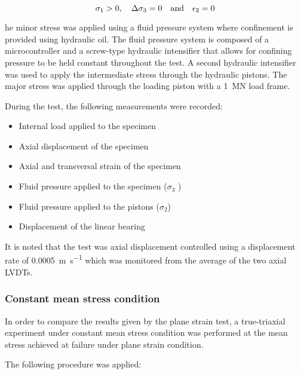 \begin{equation}
    \sigma_1 > 0 ,\quad \Delta\sigma_3 = 0 \quad \textmd{and} \quad \epsilon_2= 0
\end{equation}

he minor stress was applied using a fluid pressure system where confinement is provided using hydraulic oil. The fluid pressure system is composed of a microcontroller and a screw-type hydraulic intensifier that allows for confining pressure to be held constant throughout the test. A second hydraulic intensifier was used to apply the intermediate stress through the hydraulic pistons. The major stress was applied through the loading piston with a \SI{1}{\mega\newton} load frame. 

During the test, the following measurements were recorded: 

\begin{itemize}
    \item Internal load applied to the specimen 
    \item Axial displacement of the specimen 
    \item Axial and transversal strain of the specimen
    \item Fluid pressure applied to the specimen ($\sigma_3$ ) 
    \item Fluid pressure applied to the pistons ($\sigma_2$) 
    \item Displacement of the linear bearing
\end{itemize}

It is noted that the test was axial displacement controlled using a displacement rate of \SI{0.0005}{\meter\per\second} which was monitored from the average of the two axial LVDTs.

\subsubsection{Constant mean stress condition}


In order to compare the results given by the plane strain test, a true-triaxial experiment under constant mean stress condition was performed at the mean stress achieved at failure under plane strain condition. 

The following procedure was applied:  

